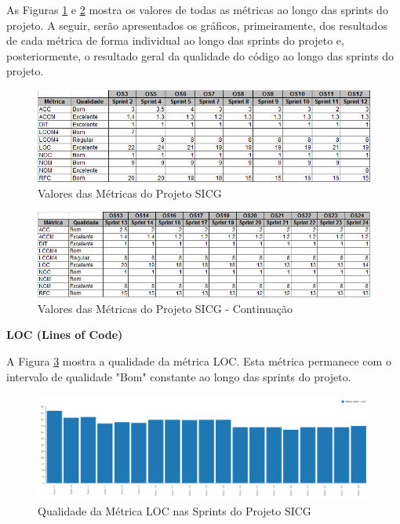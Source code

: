 As Figuras \ref{metricasprint} e \ref{metricasprint2} mostra os valores de todas as métricas ao longo das sprints do projeto. A seguir, serão apresentados os gráficos, primeiramente, dos resultados de cada métrica de forma individual ao longo das sprints do projeto e, posteriormente, o resultado geral da qualidade do código ao longo das sprints do projeto.

\begin{figure}[H]
		\centering
			\includegraphics[scale=0.8]{figuras/metricasprint.png}
		\caption{Valores das Métricas do Projeto SICG}
		\label{metricasprint}
\end{figure}

\begin{figure}[H]
		\centering
			\includegraphics[scale=0.8]{figuras/metricasprint2.png}
		\caption{Valores das Métricas do Projeto SICG - Continuação}
		\label{metricasprint2}
\end{figure}


\textbf{LOC (Lines of Code)}

A Figura \ref{loc} mostra a qualidade da métrica LOC. Esta métrica permanece com o intervalo de qualidade "Bom" constante ao longo das sprints do projeto.

\begin{figure}[H]
		\centering
			\includegraphics[scale=0.4]{figuras/loc.png}
		\caption{Qualidade da Métrica LOC nas Sprints do Projeto SICG}
		\label{loc}
\end{figure}

